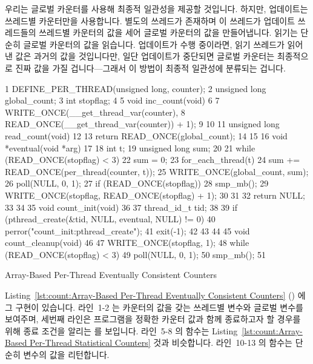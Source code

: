 우리는 글로벌 카운터를 사용해 최종적 일관성을 제공할 것입니다.
하지만, 업데이트는 쓰레드별 카운터만을 사용합니다.
별도의 쓰레드가 존재하며 이 쓰레드가 업데이트 쓰레드들의 쓰레드별 카운터의 값을
세어 글로벌 카운터의 값을 만들어냅니다.
읽기는 단순히 글로벌 카운터의 값을 읽습니다.
업데이트가 수행 중이라면, 읽기 쓰레드가 읽어낸 값은 과거의 값을 것입니다만,
일단 업데이트가 중단되면 글로벌 카운터는 최종적으로 진짜 값을 가질
겁니다---그래서 이 방법이 최종적 일관성에 분류되는 겁니다.

\begin{listing}[tbp]
{ \scriptsize
\begin{verbbox}
 1 DEFINE_PER_THREAD(unsigned long, counter);
 2 unsigned long global_count;
 3 int stopflag;
 4
 5 void inc_count(void)
 6 {
 7   WRITE_ONCE(__get_thread_var(counter),
 8              READ_ONCE(__get_thread_var(counter)) + 1);
 9 }
10
11 unsigned long read_count(void)
12 {
13   return READ_ONCE(global_count);
14 }
15
16 void *eventual(void *arg)
17 {
18   int t;
19   unsigned long sum;
20
21   while (READ_ONCE(stopflag) < 3) {
22     sum = 0;
23     for_each_thread(t)
24       sum += READ_ONCE(per_thread(counter, t));
25     WRITE_ONCE(global_count, sum);
26     poll(NULL, 0, 1);
27     if (READ_ONCE(stopflag)) {
28       smp_mb();
29       WRITE_ONCE(stopflag, READ_ONCE(stopflag) + 1);
30     }
31   }
32   return NULL;
33 }
34
35 void count_init(void)
36 {
37   thread_id_t tid;
38
39   if (pthread_create(&tid, NULL, eventual, NULL) != 0) {
40     perror("count_init:pthread_create");
41     exit(-1);
42   }
43 }
44
45 void count_cleanup(void)
46 {
47   WRITE_ONCE(stopflag, 1);
48   while (READ_ONCE(stopflag) < 3)
49     poll(NULL, 0, 1);
50   smp_mb();
51 }
\end{verbbox}
}
\centering
\theverbbox
\caption{Array-Based Per-Thread Eventually Consistent Counters}
\label{lst:count:Array-Based Per-Thread Eventually Consistent Counters}
\end{listing}

Listing~\ref{lst:count:Array-Based Per-Thread Eventually Consistent Counters}
() 에 그 구현이 있습니다.
라인~1-2 는 카운터의 값을 갖는 쓰레드별 변수와 글로벌 변수를 보여주며, 세번째
라인은 프로그램을 정확한 카운터 값과 함께 종료하고자 할 경우를 위해 종료 조건을
알리는  를 보입니다.
라인~5-8 의  함수는 Listing~\ref{lst:count:Array-Based
Per-Thread Statistical Counters} 것과 비슷합니다.
라인~10-13 의  함수는 단순히  변수의 값을
리턴합니다.
\iffalse

